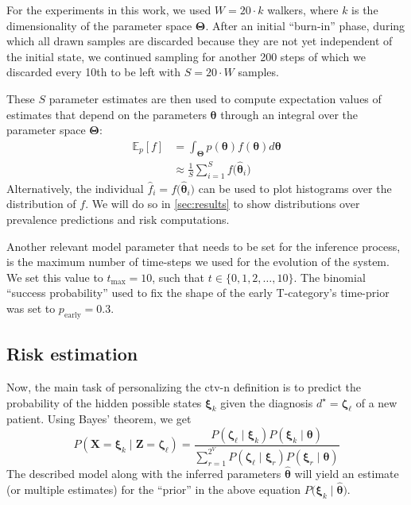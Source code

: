 \documentclass[twocolumn]{aastex631}
\begin{document}
For the experiments in this work, we used $W = 20 \cdot k$ walkers, where $k$ is the dimensionality of the parameter space $\boldsymbol{\Theta}$. After an initial ``burn-in'' phase, during which all drawn samples are discarded because they are not yet independent of the initial state, we continued sampling for another 200 steps of which we discarded every 10th to be left with $S = 20 \cdot W$ samples.

These $S$ parameter estimates are then used to compute expectation values of estimates that depend on the parameters $\boldsymbol{\theta}$ through an integral over the parameter space $\boldsymbol{\Theta}$:
%
\begin{equation}
    \begin{aligned}
        \mathbb{E}_p \left[ f \right] &= \int_{\boldsymbol{\Theta}} p(\boldsymbol{\theta}) f(\boldsymbol{\theta}) d\boldsymbol{\theta} \\
        &\approx \frac{1}{S} \sum_{i=1}^S f \big( \boldsymbol{\hat{\theta}}_i \big)
    \end{aligned}
\end{equation}
%
Alternatively, the individual $\hat{f}_i = f\big( \boldsymbol{\hat{\theta}}_i \big)$ can be used to plot histograms over the distribution of $f$. We will do so in \cref{sec:results} to show distributions over prevalence predictions and risk computations.

Another relevant model parameter that needs to be set for the inference process, is the maximum number of time-steps we used for the evolution of the system. We set this value to $t_\text{max} = 10$, such that $t \in \{ 0, 1, 2, \ldots, 10 \}$. The binomial ``success probability'' used to fix the shape of the early T-category's time-prior was set to $p_\text{early} = 0.3$.


\subsection{Risk estimation}
\label{subsec:formalism:risk}

Now, the main task of personalizing the \gls{ctv-n} definition is to predict the probability of the hidden possible states $\boldsymbol{\xi}_k$ given the diagnosis $d^\star=\boldsymbol{\zeta}_\ell$ of a new patient. Using Bayes' theorem, we get
%
\begin{equation}
    P\left( \mathbf{X}=\boldsymbol{\xi}_k \mid \mathbf{Z}=\boldsymbol{\zeta}_\ell \right) = \frac{P\left( \boldsymbol{\zeta}_\ell \mid \boldsymbol{\xi}_k \right) P\left( \boldsymbol{\xi}_k \mid \boldsymbol{\theta} \right)}{\sum_{r=1}^{2^V} P\left( \boldsymbol{\zeta}_\ell \mid \boldsymbol{\xi}_r \right) P\left( \boldsymbol{\xi}_r \mid \boldsymbol{\theta} \right) }
\end{equation}
%
The described model along with the inferred parameters $\boldsymbol{\hat{\theta}}$ will yield an estimate (or multiple estimates) for the ``prior'' in the above equation $P\big( \boldsymbol{\xi}_k \mid \boldsymbol{\hat{\theta}} \big)$.
\end{document}
